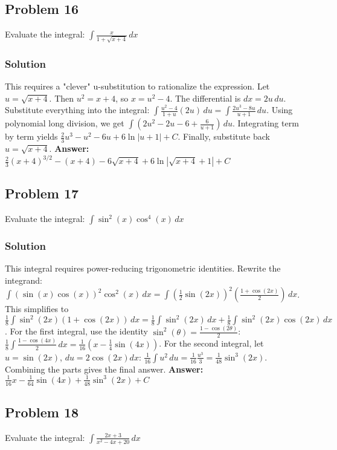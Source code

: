 \documentclass{article}
\begin{document}
\subsection{Problem 16}
Evaluate the integral: $ \int \frac{x}{1 + \sqrt{x+4}} \,dx $
\subsubsection*{Solution}
This requires a "clever" u-substitution to rationalize the expression.
Let $u = \sqrt{x+4}$. Then $u^2 = x+4$, so $x = u^2 - 4$.
The differential is $dx = 2u \,du$.
Substitute everything into the integral: $ \int \frac{u^2 - 4}{1 + u} (2u) \,du = \int \frac{2u^3 - 8u}{u+1} \,du $.
Using polynomial long division, we get $ \int \left(2u^2 - 2u - 6 + \frac{6}{u+1}\right) \,du $.
Integrating term by term yields $ \frac{2}{3}u^3 - u^2 - 6u + 6\ln|u+1| + C $.
Finally, substitute back $u = \sqrt{x+4}$.
\textbf{Answer:} $ \frac{2}{3}(x+4)^{3/2} - (x+4) - 6\sqrt{x+4} + 6\ln|\sqrt{x+4}+1| + C $

\subsection{Problem 17}
Evaluate the integral: $ \int \sin^2(x) \cos^4(x) \,dx $
\subsubsection*{Solution}
This integral requires power-reducing trigonometric identities.
Rewrite the integrand: $ \int (\sin(x)\cos(x))^2 \cos^2(x) \,dx = \int \left(\frac{1}{2}\sin(2x)\right)^2 \left(\frac{1+\cos(2x)}{2}\right) \,dx $.
This simplifies to $ \frac{1}{8} \int \sin^2(2x)(1+\cos(2x)) \,dx = \frac{1}{8} \int \sin^2(2x) \,dx + \frac{1}{8} \int \sin^2(2x)\cos(2x) \,dx $.
For the first integral, use the identity $ \sin^2(\theta) = \frac{1-\cos(2\theta)}{2} $: $ \frac{1}{8} \int \frac{1-\cos(4x)}{2} \,dx = \frac{1}{16}\left(x - \frac{1}{4}\sin(4x)\right) $.
For the second integral, let $u=\sin(2x)$, $du = 2\cos(2x)dx$: $ \frac{1}{16} \int u^2 \,du = \frac{1}{16} \frac{u^3}{3} = \frac{1}{48}\sin^3(2x) $.
Combining the parts gives the final answer.
\textbf{Answer:} $ \frac{1}{16}x - \frac{1}{64}\sin(4x) + \frac{1}{48}\sin^3(2x) + C $

\subsection{Problem 18}
Evaluate the integral: $ \int \frac{2x+3}{x^2 - 4x + 20} \,dx $
\end{document}
